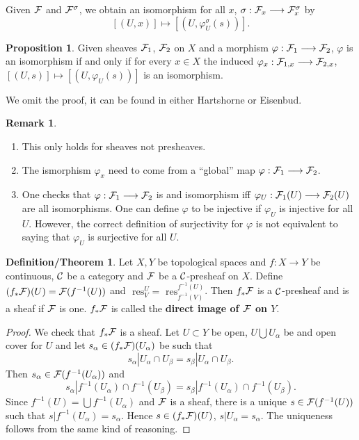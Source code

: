 \documentclass[11pt]{article}
\theoremstyle{definition}
\newtheorem{prop}[thm]{Proposition}
\newtheorem{rmk}[thm]{Remark}
\newtheorem{dfn/thm}[thm]{Definition/Theorem}
\newcommand{\res}{\text{ res}}
\newcommand{\calf}{{\cal F}}
\newcommand{\calc}{{\cal C}}
\begin{document}
Given $\calf$ and $\calf^\sigma$, we obtain an isomorphism for all $x$, $\sigma: \calf_x \longrightarrow \calf^\sigma_x$ by
$$
[(U,x)] \longmapsto [(U,\varphi^\sigma_U(s))].
$$

\begin{prop}
    Given sheaves $\calf_1$, $\calf_2$ on $X$ and a morphism $\varphi: \calf_1 \longrightarrow \calf_2$, $\varphi$ is an isomorphism if and only if for every $x\in X$ the induced $\varphi_x: \calf_{1,x} \longrightarrow \calf_{2,x}$, $[(U,s)] \longmapsto [(U, \varphi_U(s))]$ is an isomorphism.
\end{prop}

We omit the proof, it can be found in either Hartshorne or Eisenbud.

\begin{rmk}\ 
    \begin{enumerate}[label=(\arabic*)]
        \item 
        This only holds for sheaves not presheaves.
        \item
        The ismorphism $\varphi_x$ need to come from a ``global'' map $\varphi: \calf_1 \longrightarrow \calf_2$.
        \item
        One checks that $\varphi: \calf_1 \longrightarrow \calf_2$ is and isomorphism iff $\varphi_U: \calf_1(U) \longrightarrow \calf_2(U)$ are all isomorphisms. One can define $\varphi$ to be injective if $\varphi_U$ is injective for all $U$. However, the correct definition of surjectivity for $\varphi$ is not equivalent to saying that $\varphi_U$ is surjective for all $U$.
    \end{enumerate}
\end{rmk}

\begin{dfn/thm}
    Let $X,Y$ be topological spaces and $f:X\longrightarrow Y$ be continuous, $\calc$ be a category and $\calf$ be a $\calc$-presheaf on $X$. Define $(f_* \calf)(U)=\calf (f^{-1}(U))$ and $\res_V^U = \res_{f^{-1}(V)}^{f^{-1}(U)}$. Then $f_*\calf$ is a $\calc$-presheaf and is a sheaf if $\calf$ is one.
    $f_*\calf$ is called the \textbf{direct image of $\calf$ on $Y$}.
\end{dfn/thm}

\begin{proof}
    We check that $f_*\calf$ is a sheaf. Let $U\subset Y$ be open, $U \bigcup U_\alpha$ be and open cover for $U$ and let $s_\alpha \in (f_* \calf)(U_\alpha)$ be such that 
    $$
    s_\alpha|U_\alpha\cap U_\beta = s_\beta|U_\alpha \cap U_\beta.
    $$
    Then $s_\alpha \in \calf(f^{-1}(U_\alpha))$ and
    $$
    s_\alpha|f^{-1}(U_\alpha)\cap f^{-1}(U_\beta) = s_\beta|f^{-1}(U_\alpha) \cap f^{-1}(U_\beta).
    $$
    Since $f^{-1}(U) = \bigcup f^{-1}(U_\alpha)$ and $\calf$ is a sheaf, there is a unique $s\in\calf(f^{-1}(U))$ such that $s|f^{-1}(U_\alpha) = s_\alpha$. Hence $s \in (f_*\calf)(U)$, $s|U_\alpha = s_\alpha$. The uniqueness follows from the same kind of reasoning.
\end{proof}
\end{document}
